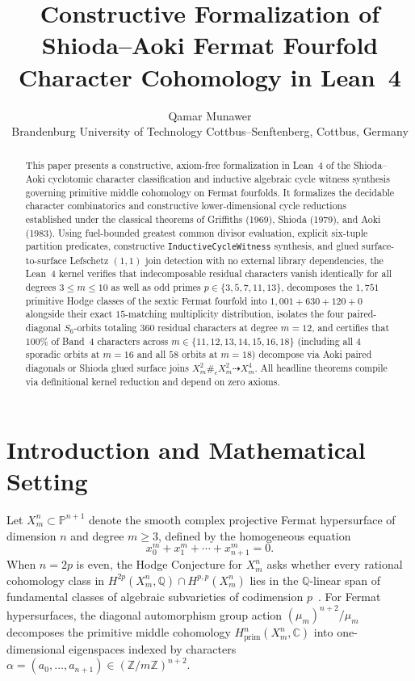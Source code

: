 \documentclass[11pt,a4paper]{article}
\title{\textbf{Constructive Formalization of Shioda--Aoki Fermat Fourfold Character Cohomology in Lean~4}}
\author{
  Qamar Munawer\\
  \small Brandenburg University of Technology Cottbus--Senftenberg, Cottbus, Germany
}
\date{}
\begin{document}
\maketitle

\begin{abstract}
This paper presents a constructive, axiom-free formalization in Lean~4 of the Shioda--Aoki cyclotomic character classification and inductive algebraic cycle witness synthesis governing primitive middle cohomology on Fermat fourfolds. It formalizes the decidable character combinatorics and constructive lower-dimensional cycle reductions established under the classical theorems of Griffiths (1969), Shioda (1979), and Aoki (1983). Using fuel-bounded greatest common divisor evaluation, explicit six-tuple partition predicates, constructive \texttt{InductiveCycleWitness} synthesis, and glued surface-to-surface Lefschetz $(1,1)$ join detection with no external library dependencies, the Lean~4 kernel verifies that indecomposable residual characters vanish identically for all degrees $3 \le m \le 10$ as well as odd primes $p \in \{3, 5, 7, 11, 13\}$, decomposes the $1{,}751$ primitive Hodge classes of the sextic Fermat fourfold into $1{,}001 + 630 + 120 + 0$ alongside their exact $15$-matching multiplicity distribution, isolates the four paired-diagonal $S_6$-orbits totaling $360$ residual characters at degree $m = 12$, and certifies that $100\%$ of Band~4 characters across $m \in \{11, 12, 13, 14, 15, 16, 18\}$ (including all $4$ sporadic orbits at $m = 16$ and all $58$ orbits at $m = 18$) decompose via Aoki paired diagonals or Shioda glued surface joins $X_m^2 \#_c X_m^2 \dashrightarrow X_m^4$. All headline theorems compile via definitional kernel reduction and depend on zero axioms.
\end{abstract}

\section{Introduction and Mathematical Setting}

Let $X_m^n \subset \mathbb{P}^{n+1}$ denote the smooth complex projective Fermat hypersurface of dimension $n$ and degree $m \ge 3$, defined by the homogeneous equation
\begin{equation}
  x_0^m + x_1^m + \cdots + x_{n+1}^m = 0.
\end{equation}
When $n = 2p$ is even, the Hodge Conjecture for $X_m^n$ asks whether every rational cohomology class in $H^{2p}(X_m^n, \mathbb{Q}) \cap H^{p,p}(X_m^n)$ lies in the $\mathbb{Q}$-linear span of fundamental classes of algebraic subvarieties of codimension $p$~\cite{Deligne2000}. For Fermat hypersurfaces, the diagonal automorphism group action $(\mu_m)^{n+2}/\mu_m$ decomposes the primitive middle cohomology $H^n_{\mathrm{prim}}(X_m^n, \mathbb{C})$ into one-dimensional eigenspaces indexed by characters $\alpha = (a_0, \dots, a_{n+1}) \in (\mathbb{Z}/m\mathbb{Z})^{n+2}$.
\end{document}
